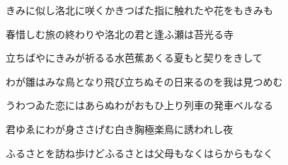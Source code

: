 \documentclass[リボン]{genkou}
\begin{document}
\begin{ribon}
きみに似し洛北に咲くかきつばた指に触れたや花をもきみも

春惜しむ旅の終わりや洛北の君と逢ふ瀬は苔光る寺

立ちばやにきみが祈るる水芭蕉あくる夏もと契りをきして

わが雛はみな鳥となり飛び立ちぬその日来るのを我は見つめむ

うわつゐた恋にはあらぬわがおもひ上り列車の発車ベルなる

君ゆゑにわが身ささげむ白き胸極楽鳥に誘われし夜

ふるさとを訪ね歩けどふるさとは父母もなくはらからもなく

\end{ribon}
\end{document}
